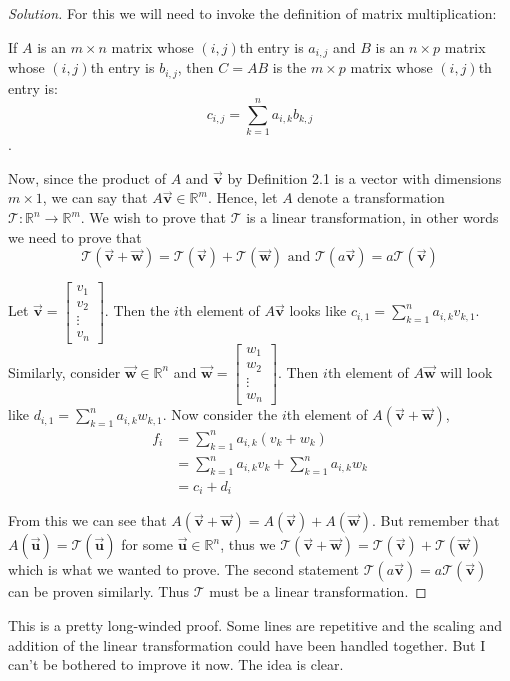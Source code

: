 \documentclass[12pt]{article}
\theoremstyle{remark}
\let\oldvec = \vec
\renewcommand{\vec}[1]{\oldvec{\mathbf{#1}}}
\begin{document}
\begin{proof}[Solution]
   For this we will need to invoke the definition of matrix multiplication: 
   \begin{important}
	   If $ A $ is an $ m \times n $ matrix whose $ (i, j) $th entry is $ a_{i, j} $ and $ B $ is an $ n \times p $ matrix whose $ (i, j) $th entry is $ b_{i, j} $, then $ C = AB $ is the $ m \times p  $ matrix whose $ (i, j) $th entry is: 
	   \[ c_{i, j} = \sum^{n}_{k=1} a_{i, k} b_{k, j} \].
   \end{important}
   Now, since the product of $ A $ and $ \vec{v} $ by Definition 2.1 is a vector with dimensions $ m \times 1 $, we can say that $ A \vec{v} \in \mathbb{R}^m $. Hence, let $ A $ denote a transformation $ \mathcal{T} : \mathbb{R}^n \rightarrow \mathbb{R}^m  $. We wish to prove that $ \mathcal{T} $ is a linear transformation, in other words we need to prove that \[ \mathcal{T}(\vec{v} + \vec{w}) %
   = \mathcal{T}(\vec{v}) + \mathcal{T}(\vec{w}) \text{ and } \mathcal{T}(a \vec{v}) = a \mathcal{T}(\vec{v})\]

   Let $ \vec{v} = \begin{bmatrix} v_{1} \\ v_{2} \\ \vdots \\ v_{n} \end{bmatrix}$. Then the $ i $th element of $ A \vec{v} $ looks like $ c_{i, 1} = \sum^{n}_{k=1} a_{i, k} v_{k, 1} $. Similarly, consider $ \vec{w} \in \mathbb{R}^n $ and $ \vec{w} = \begin{bmatrix} w_{1} \\ w_{2} \\ \vdots \\ w_{n} \end{bmatrix} $. Then $ i $th element of $ A \vec{w} $ will look like $ d_{i, 1} = \sum^{n}_{k=1} a_{i, k}w_{k, 1} $. Now consider the $ i $th element of $ A(\vec{v} + \vec{w}) $, 
	\begin{align*}
		f_{i} &= \sum^{n}_{k=1} a_{i, k}(v_{k} + w_{k}) \\ 
		      &= \sum^{n}_{k=1} a_{i, k}v_{k} + \sum^{n}_{k=1} a_{i, k}w_{k} \\
		      &= c_{i} + d_{i}
	\end{align*}

	From this we can see that $ A(\vec{v} + \vec{w}) = A(\vec{v}) + A(\vec{w}) $. But remember that $ A(\vec{u}) = \mathcal{T}(\vec{u}) $ for some $ \vec{u} \in \mathbb{R}^n $, thus we $ \mathcal{T}(\vec{v} + \vec{w})  = \mathcal{T}(\vec{v}) + \mathcal{T}(\vec{w}) $ which is what we wanted to prove. The second statement $ \mathcal{T}(a \vec{v}) = a\mathcal{T}(\vec{v}) $ can be proven similarly. Thus $ \mathcal{T} $ must be a linear transformation. 

\end{proof}

This is a pretty long-winded proof. Some lines are repetitive and the scaling and addition of the linear transformation could have been handled together. But I can't be bothered to improve it now. The idea is clear. 
\end{document}

